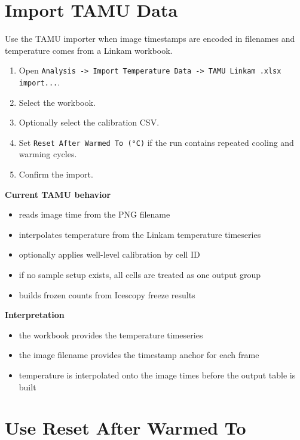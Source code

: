 \documentclass[
  9pt,
  letterpaper,
  oneside,
  open=any,
  DIV=15,
  parskip=half-,
  headings=big,
  numbers=noenddot
]{scrbook}
\newcommand{\manuallead}[1]{%
  \vspace{0.15em}%
  {\sffamily\bfseries\color{ManualBlue}#1}\par\nobreak\vspace{0.05em}%
}
\begin{document}
\section{Import TAMU Data}

Use the TAMU importer when image timestamps are encoded in filenames and temperature comes from a Linkam workbook.


\begin{enumerate}[leftmargin=*,itemsep=0.35em,topsep=0.4em]
\item Open \texttt{Analysis -> Import Temperature Data -> TAMU Linkam .xlsx import...}.
\item Select the workbook.
\item Optionally select the calibration CSV.
\item Set \texttt{Reset After Warmed To (°C)} if the run contains repeated cooling and warming cycles.
\item Confirm the import.
\end{enumerate}

\manuallead{Current TAMU behavior}

\begin{itemize}[leftmargin=*,itemsep=0.35em,topsep=0.4em]
\item reads image time from the PNG filename
\item interpolates temperature from the Linkam temperature timeseries
\item optionally applies well-level calibration by cell ID
\item if no sample setup exists, all cells are treated as one output group
\item builds frozen counts from Icescopy freeze results
\end{itemize}

\manuallead{Interpretation}

\begin{itemize}[leftmargin=*,itemsep=0.35em,topsep=0.4em]
\item the workbook provides the temperature timeseries
\item the image filename provides the timestamp anchor for each frame
\item temperature is interpolated onto the image times before the output table is built
\end{itemize}

\section{Use Reset After Warmed To}
\end{document}
